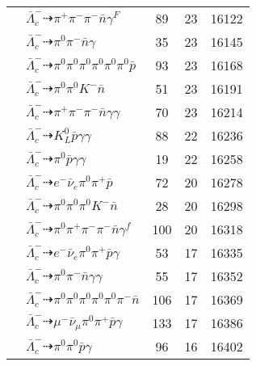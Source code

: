 \documentclass[landscape]{article}
\newcounter{rownumbers}
\newcommand\rn{\stepcounter{rownumbers}\arabic{rownumbers}}
\newcommand{\EOL}{\\} %
\newcommand{\topoTags}[1]{#1} %
\begin{document}
\begin{longtable}{clccc}
\rn & $ \bar{\Lambda}_{c}^{-} \dashrightarrow \pi^{+} \pi^{-} \pi^{-} \bar{n} \gamma^{F} $ & \topoTags{89 & }23 & 16122 \EOL

\rn & $ \bar{\Lambda}_{c}^{-} \dashrightarrow \pi^{0} \pi^{-} \bar{n} \gamma $ & \topoTags{35 & }23 & 16145 \EOL

\rn & $ \bar{\Lambda}_{c}^{-} \dashrightarrow \pi^{0} \pi^{0} \pi^{0} \pi^{0} \pi^{0} \pi^{0} \bar{p} $ & \topoTags{93 & }23 & 16168 \EOL

\rn & $ \bar{\Lambda}_{c}^{-} \dashrightarrow \pi^{0} \pi^{0} K^{-} \bar{n} $ & \topoTags{51 & }23 & 16191 \EOL

\rn & $ \bar{\Lambda}_{c}^{-} \dashrightarrow \pi^{+} \pi^{-} \pi^{-} \bar{n} \gamma \gamma $ & \topoTags{70 & }23 & 16214 \EOL

\rn & $ \bar{\Lambda}_{c}^{-} \dashrightarrow K_{L}^{0} \bar{p} \gamma \gamma $ & \topoTags{88 & }22 & 16236 \EOL

\rn & $ \bar{\Lambda}_{c}^{-} \dashrightarrow \pi^{0} \bar{p} \gamma \gamma $ & \topoTags{19 & }22 & 16258 \EOL

\rn & $ \bar{\Lambda}_{c}^{-} \dashrightarrow e^{-} \bar{\nu}_{e} \pi^{0} \pi^{+} \bar{p} $ & \topoTags{72 & }20 & 16278 \EOL

\rn & $ \bar{\Lambda}_{c}^{-} \dashrightarrow \pi^{0} \pi^{0} \pi^{0} K^{-} \bar{n} $ & \topoTags{28 & }20 & 16298 \EOL

\rn & $ \bar{\Lambda}_{c}^{-} \dashrightarrow \pi^{0} \pi^{+} \pi^{-} \pi^{-} \bar{n} \gamma^{f} $ & \topoTags{100 & }20 & 16318 \EOL

\rn & $ \bar{\Lambda}_{c}^{-} \dashrightarrow e^{-} \bar{\nu}_{e} \pi^{0} \pi^{+} \bar{p} \gamma $ & \topoTags{53 & }17 & 16335 \EOL

\rn & $ \bar{\Lambda}_{c}^{-} \dashrightarrow \pi^{0} \pi^{-} \bar{n} \gamma \gamma $ & \topoTags{55 & }17 & 16352 \EOL

\rn & $ \bar{\Lambda}_{c}^{-} \dashrightarrow \pi^{0} \pi^{0} \pi^{0} \pi^{0} \pi^{0} \pi^{-} \bar{n} $ & \topoTags{106 & }17 & 16369 \EOL

\rn & $ \bar{\Lambda}_{c}^{-} \dashrightarrow \mu^{-} \bar{\nu}_{\mu} \pi^{0} \pi^{+} \bar{p} \gamma $ & \topoTags{133 & }17 & 16386 \EOL

\rn & $ \bar{\Lambda}_{c}^{-} \dashrightarrow \pi^{0} \pi^{0} \bar{p} \gamma $ & \topoTags{96 & }16 & 16402 \EOL


\end{longtable}
\end{document}

